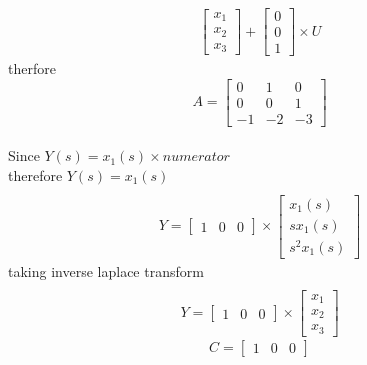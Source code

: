 \begin{enumerate}[label=\thesection.\arabic*.,ref=\thesection.\theenumi]
\begin{gather}
\begin{bmatrix}
x_{1}\\
x_{2}\\
x_{3}
\end{bmatrix}
+
\begin{bmatrix}
0\\
0\\
1
\end{bmatrix} \times U
\end{gather}
therfore
\begin{equation}
A=\begin{bmatrix}
0&1&0\\
0&0&1\\
-1&-2&-3
\end{bmatrix}
\end{equation}
\\
Since $ Y(s)=x_{1}(s)\times numerator$
\\therefore $ Y(s)=x_{1}(s) $
\begin{gather}
\\Y=
\begin{bmatrix}
1&0&0
\end{bmatrix}\times \begin{bmatrix}
x_{1}(s)\\
sx_{1}(s)\\
s^2x_{1}(s)
\end{bmatrix} 
\end{gather}
taking inverse laplace transform
\begin{gather}
\\Y=
\begin{bmatrix}
1&0&0
\end{bmatrix}\times \begin{bmatrix}
x_{1}\\
x_{2}\\
x_{3}
\end{bmatrix} 
\end{gather}
\begin{equation}
C=\begin{bmatrix}
1&0&0
\end{bmatrix}
\end{equation}
%

%
\end{enumerate}

